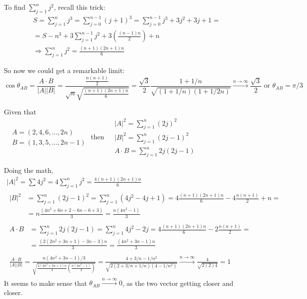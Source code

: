 \documentclass[twoside]{amsart}
\theoremstyle{plain}
\theoremstyle{definition}
\newcommand{\exercisehead}[1]
  {\smallskip
   \noindent{\small\bf Exercise #1.}}
\begin{document}
To find $\sum_{j=1}^n j^2$, recall this trick:
\[
\begin{gathered}
  S = \sum_{j=1}^n j^3 = \sum_{j=0}^{n-1} (j+1)^3 = \sum_{j=0}^{n-1} j^3 + 3j^2 + 3j + 1 = \\
  = S - n^3 + 3 \sum_{j=1}^{n-1} j^2 + 3 \left( \frac{ (n-1)n }{ 2 } \right) + n \\
  \Longrightarrow \sum_{j=1}^n j^2 = \frac{ (n+1)(2n+1)n}{6 } 
\end{gathered}
\]

So now we could get a remarkable limit:
\[
\cos{ \theta_{AB}} = \frac{ A \cdot B}{|A||B|} = \frac{ \frac{ n (n+1)}{2} }{ \sqrt{n} \sqrt{ \frac{ (n+1)(2n+1) n }{6} }} = \frac{ \sqrt{3}}{2} \frac{ 1 + 1/n}{ \sqrt{ (1+1/n)(1+1/2n ) } } \xrightarrow{ n \to \infty} \boxed{ \frac{ \sqrt{3}}{2} } \text{ or } \theta_{AB} = \pi/3
\]

\exercisehead{9} Given that \\
$\begin{aligned}
  & A = (2,4,6,\dots, 2n ) \\
  & B = (1,3,5, \dots, 2n-1) 
\end{aligned}$ \quad \quad then 
$\begin{aligned}
  & |A|^2 = \sum_{j=1}^n (2j)^2 \\
  & |B|^2 = \sum_{j=1}^n (2j-1)^2 \\
  & A\cdot B = \sum_{j=1}^n 2j(2j-1) 
\end{aligned}$

Doing the math,
\[
\begin{gathered}
  |A|^2 = \sum 4j^2 = 4 \sum_{j=1}^n j^2 = \frac{4 (n+1)(2n+1) n }{6} \\
  \begin{aligned} 
    |B|^2 & = \sum_{j=1}^n (2j-1)^2 =  \sum_{j=1}^n (4j^2 - 4j +1) = 4 \frac{ (n+1)(2n+1)n }{6} - 4 \frac{ n(n+1)}{2} + n = \\
    & = n \frac{ (4n^2 + 6n +2 - 6n -6 +3 ) }{3 } = \frac{ n (4n^2 - 1 ) }{3 } 
    \end{aligned} \\
  \begin{aligned}
    A\cdot B & = \sum_{j=1}^n 2j (2j-1) = \sum_{j=1}^n 4j^2 - 2 j = 4 \frac{ (n+1)(2n+1) n }{6} - 2 \frac{ n(n+1)}{2} = \\
    & = \frac{ ( 2 (2n^2 + 3n + 1 ) - 3 n -3 ) n }{ 3 } = \frac{ (4n^2 + 3n-1) n }{3 } 
  \end{aligned} \\
  \begin{aligned}
    \frac{ A \cdot B}{|A||B|} = \frac{ n (4n^2 + 3n-1)/3 }{ \sqrt{ \frac{ 2 ( 2n^2 + 3n+1) n }{3} \left( \frac{ n (4n^2 - 1 ) }{3 } \right) } } = \frac{ 4 + 3/n - 1 /n^2 }{ \sqrt{ 2 ( 2 + 3/n + 1/ n ) (4-  1/n^2 ) } } \xrightarrow{ n \to \infty} \frac{ 4 }{ \sqrt{ 2 (2) 4 } } = \boxed{ 1 } 
\end{aligned}
\end{gathered}
\]
It seems to make sense that $\theta_{AB} \xrightarrow{ n\to \infty} 0$, as the two vector getting closer and closer.  
\end{document}
